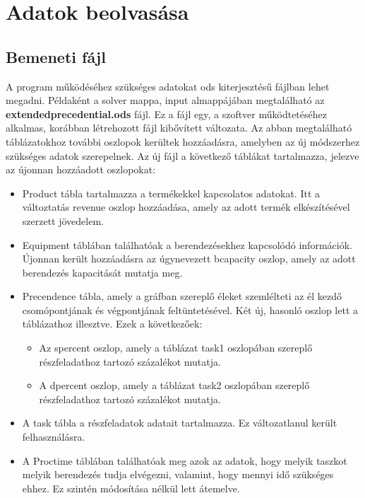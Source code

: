 \section{Adatok beolvasása}
\subsection{Bemeneti fájl}
A program működéséhez szükséges adatokat ods kiterjesztésű fájlban lehet megadni. Példaként a solver mappa, input almappájában megtalálható az \textbf{extended\textunderscore precedential.ods} fájl. Ez a fájl egy, a szoftver működtetéséhez alkalmas, korábban létrehozott fájl kibővített változata. Az abban megtalálható táblázatokhoz további oszlopok kerültek hozzáadásra, amelyben az új módszerhez szükséges adatok szerepelnek. Az új fájl a következő táblákat tartalmazza, jelezve az újonnan hozzáadott oszlopokat:
\begin{itemize}
  \item Product tábla tartalmazza a termékekkel kapcsolatos adatokat. Itt a változtatás revenue oszlop hozzáadása, amely az adott termék elkészítésével szerzett jövedelem.
  \item Equipment táblában találhatóak a berendezésekhez kapcsolódó információk. Újonnan került hozzáadásra az úgynevezett b\textunderscore capacity oszlop, amely az adott berendezés kapacitását mutatja meg.
  \item Precendence tábla, amely a gráfban szereplő éleket szemlélteti az él kezdő csomópontjának és végpontjának feltüntetésével. Két új, hasonló oszlop lett a táblázathoz illesztve. Ezek a következőek:
  	\begin{itemize}
  		\item Az s\textunderscore percent oszlop, amely a táblázat task1 oszlopában szereplő részfeladathoz tartozó százalékot mutatja.
  		\item A d\textunderscore percent oszlop, amely a táblázat task2 oszlopában szereplő részfeladathoz tartozó százalékot mutatja.
  	\end{itemize}
  	\item A task tábla a részfeladatok adatait tartalmazza. Ez változatlanul került felhasználásra.
  	\item A Proctime táblában találhatóak meg azok az adatok, hogy melyik taszkot melyik berendezés tudja elvégezni, valamint, hogy mennyi idő szükséges ehhez. Ez szintén módosítása nélkül lett átemelve.
\end{itemize}
